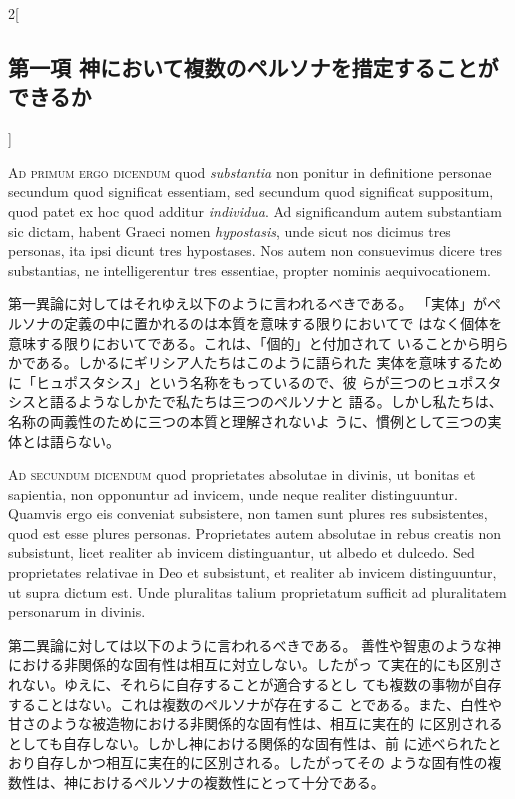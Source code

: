 \documentclass[paper=a4paper,fontsize=10pt,jafontsize=9pt,titlepage]{jlreq}
\begin{document}
\begin{paracol}{2}[\subsection{第一項 神において複数のペルソナを措定することができるか}]
\switchcolumn*[\subsection{ad.1}]


{\scshape Ad primum ergo dicendum} quod {\itshape substantia} non ponitur in definitione
personae secundum quod significat essentiam, sed secundum quod
significat suppositum, quod patet ex hoc quod additur {\itshape individua}. Ad
significandum autem substantiam sic dictam, habent Graeci nomen
{\itshape hypostasis}, unde sicut nos dicimus tres personas, ita ipsi dicunt tres
hypostases. Nos autem non consuevimus dicere tres substantias, ne
intelligerentur tres essentiae, propter nominis aequivocationem.


\switchcolumn


第一異論に対してはそれゆえ以下のように言われるべきである。
「実体」がペルソナの定義の中に置かれるのは本質を意味する限りにおいてで
 はなく個体を意味する限りにおいてである。これは、「個的」と付加されて
 いることから明らかである。しかるにギリシア人たちはこのように語られた
 実体を意味するために「ヒュポスタシス」という名称をもっているので、彼
 らが三つのヒュポスタシスと語るようなしかたで私たちは三つのペルソナと
 語る。しかし私たちは、名称の両義性のために三つの本質と理解されないよ
 うに、慣例として三つの実体とは語らない。


\switchcolumn*[\subsection{ad.2}]


{\scshape Ad secundum dicendum} quod proprietates absolutae in divinis, ut
bonitas et sapientia, non opponuntur ad invicem, unde neque realiter
distinguuntur. Quamvis ergo eis conveniat subsistere, non tamen sunt
plures res subsistentes, quod est esse plures personas. Proprietates
autem absolutae in rebus creatis non subsistunt, licet realiter ab
invicem distinguantur, ut albedo et dulcedo. Sed proprietates
relativae in Deo et subsistunt, et realiter ab invicem distinguuntur,
ut supra dictum est. Unde pluralitas talium proprietatum sufficit ad
pluralitatem personarum in divinis.


\switchcolumn


第二異論に対しては以下のように言われるべきである。
善性や智恵のような神における非関係的な固有性は相互に対立しない。したがっ
 て実在的にも区別されない。ゆえに、それらに自存することが適合するとし
 ても複数の事物が自存することはない。これは複数のペルソナが存在するこ
 とである。また、白性や甘さのような被造物における非関係的な固有性は、相互に実在的
 に区別されるとしても自存しない。しかし神における関係的な固有性は、前
 に述べられたとおり自存しかつ相互に実在的に区別される。したがってその
 ような固有性の複数性は、神におけるペルソナの複数性にとって十分である。



\end{paracol}
\end{document}
